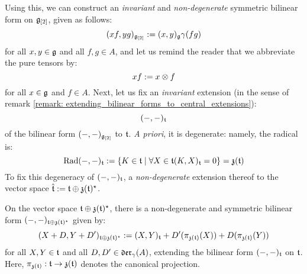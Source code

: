         Using this, we can construct an \textit{invariant} and \textit{non-degenerate} symmetric bilinear form on $\mathfrak{g}_{[2]}$, given as follows:
            $$(xf, yg)_{\mathfrak{g}_{[2]}} := (x, y)_{\mathfrak{g}} \gamma(fg)$$
        for all $x, y \in \mathfrak{g}$ and all $f, g \in A$, and let us remind the reader that we abbreviate the pure tensors by:
            $$xf := x \tensor f$$
        for all $x \in \mathfrak{g}$ and $f \in A$. Next, let us fix an \textit{invariant} extension (in the sense of remark \ref{remark: extending_bilinear_forms_to_central_extensions}):
            $$(-, -)_{\mathfrak{t}}$$
        of the bilinear form $(-, -)_{\mathfrak{g}_{[2]}}$ to $\mathfrak{t}$. \textit{A priori}, it is degenerate: namely, the radical is:
            $$\operatorname{Rad}(-, -)_{\mathfrak{t}} := \{ K \in \mathfrak{t} \mid \forall X \in \mathfrak{t} (K, X)_{\mathfrak{t}} = 0 \} = \mathfrak{z}(\mathfrak{t})$$
        To fix this degeneracy of $(-, -)_{\mathfrak{t}}$, a \textit{non-degenerate} extension thereof to the vector space $\hat{\mathfrak{t}} := \mathfrak{t} \oplus \mathfrak{z}(\mathfrak{t})^{\star}$.
        \begin{proposition} \label{prop: extended_toroidal_bilinear_form}
            On the vector space $\mathfrak{t} \oplus \mathfrak{z}(\mathfrak{t})^{\star}$, there is a non-degenerate and symmetric bilinear form $(-, -)_{\mathfrak{t} \oplus \mathfrak{z}(\mathfrak{t})^{\star}}$ given by:
                $$( X + D, Y + D' )_{\mathfrak{t} \oplus \mathfrak{z}(\mathfrak{t})^{\star}} := (X, Y)_{\mathfrak{t}} + D'( \pi_{\mathfrak{z}(\mathfrak{t})}(X) ) + D( \pi_{\mathfrak{z}(\mathfrak{t})}(Y) )$$
            for all $X, Y \in \mathfrak{t}$ and all $D, D' \in \mathfrak{der}_{\gamma}(A)$, extending the bilinear form $(-, -)_{\mathfrak{t}}$ on $\mathfrak{t}$. Here, $\pi_{\mathfrak{z}(\mathfrak{t})}: \mathfrak{t} \to \mathfrak{z}(\mathfrak{t})$ denotes the canonical projection.
        \end{proposition}

